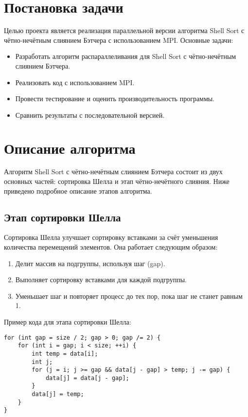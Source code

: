 \documentclass[a4paper,12pt]{article}
\begin{document}
\section{Постановка задачи}
Целью проекта является реализация параллельной версии алгоритма Shell Sort с чётно-нечётным слиянием Бэтчера с использованием MPI. Основные задачи:
\begin{itemize}
    \item Разработать алгоритм распараллеливания для Shell Sort с чётно-нечётным слиянием Бэтчера.
    \item Реализовать код с использованием MPI.
    \item Провести тестирование и оценить производительность программы.
    \item Сравнить результаты с последовательной версией.
\end{itemize}

\section{Описание алгоритма}
Алгоритм Shell Sort с чётно-нечётным слиянием Бэтчера состоит из двух основных частей: сортировка Шелла и этап чётно-нечётного слияния. Ниже приведено подробное описание этапов алгоритма.

\subsection{Этап сортировки Шелла}
Сортировка Шелла улучшает сортировку вставками за счёт уменьшения количества перемещений элементов. Она работает следующим образом:
\begin{enumerate}
    \item Делит массив на подгруппы, используя шаг (gap).
    \item Выполняет сортировку вставками для каждой подгруппы.
    \item Уменьшает шаг и повторяет процесс до тех пор, пока шаг не станет равным 1.
\end{enumerate}

Пример кода для этапа сортировки Шелла:
\begin{lstlisting}
for (int gap = size / 2; gap > 0; gap /= 2) {
    for (int i = gap; i < size; ++i) {
        int temp = data[i];
        int j;
        for (j = i; j >= gap && data[j - gap] > temp; j -= gap) {
            data[j] = data[j - gap];
        }
        data[j] = temp;
    }
}
\end{lstlisting}
\end{document}
